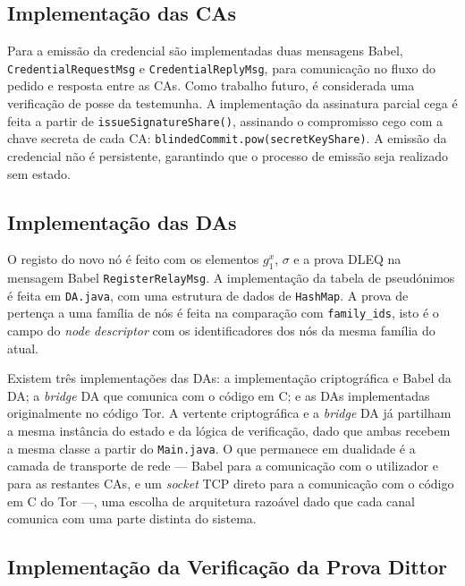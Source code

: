 \subsection{Implementação das CAs}
\label{sub:dittor_impl_cas}

Para a emissão da credencial são implementadas duas mensagens Babel, \texttt{CredentialRequestMsg} e \texttt{CredentialReplyMsg}, para comunicação no fluxo do pedido e resposta entre as CAs. Como trabalho futuro, é considerada uma verificação de posse da testemunha. A implementação da assinatura parcial cega é feita a partir de \texttt{issueSignatureShare()}, assinando o compromisso cego com a chave secreta de cada CA: \texttt{blindedCommit.pow(secretKeyShare)}. A emissão da credencial não é persistente, garantindo que o processo de emissão seja realizado sem estado.

\subsection{Implementação das DAs}
\label{sub:dittor_impl_das}

O registo do novo nó é feito com os elementos $g_1^x$, $\sigma$ e a prova DLEQ na mensagem Babel \texttt{RegisterRelayMsg}. A implementação da tabela de pseudónimos é feita em \texttt{DA.java}, com uma estrutura de dados de \texttt{HashMap}. A prova de pertença a uma família de nós é feita na comparação com \texttt{family\_ids}, isto é o campo do \textit{node descriptor} com os identificadores dos nós da mesma família do atual.

Existem três implementações das DAs: a implementação criptográfica e Babel da DA; a \textit{bridge} DA que comunica com o código em C; e as DAs implementadas originalmente no código Tor. A vertente criptográfica e a \textit{bridge} DA já partilham a mesma instância do estado e da lógica de verificação, dado que ambas recebem a mesma classe a partir do \texttt{Main.java}. O que permanece em dualidade é a camada de transporte de rede — Babel para a comunicação com o utilizador e para as restantes CAs, e um \textit{socket} TCP direto para a comunicação com o código em C do Tor —, uma escolha de arquitetura razoável dado que cada canal comunica com uma parte distinta do sistema.

\subsection{Implementação da Verificação da Prova Dittor}
\label{sub:dittor_impl_verificacao}

